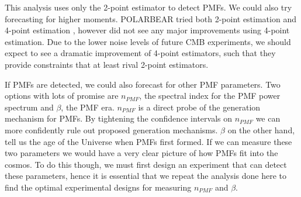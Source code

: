 This analysis uses only the 2-point estimator to detect PMFs. We could also try forecasting for higher moments. POLARBEAR tried both 2-point estimation and 4-point estimation \cite{Ade:2015cao}, however did not see any major improvements using 4-point estimation. Due to the lower noise levels of future CMB experiments, we should expect to see a dramatic improvement of 4-point estimators, such that they provide constraints that at least rival 2-point estimators.

If PMFs are detected, we could also forecast for other PMF parameters. Two options with lots of promise are $n_{PMF}$, the spectral index for the PMF power spectrum and $\beta$, the PMF era. $n_{PMF}$ is a direct probe of the generation mechanism for PMFs. By tightening the confidence intervals on $n_{PMF}$ we can more confidently rule out proposed generation mechanisms. $\beta$ on the other hand, tell us the age of the Universe when PMFs first formed. If we can measure these two parameters we would have a very clear picture of how PMFs fit into the cosmos. To do this though, we must first design an experiment that can detect these parameters, hence it is essential that we repeat the analysis done here to find the optimal experimental designs for measuring $n_{PMF}$ and $\beta$.
